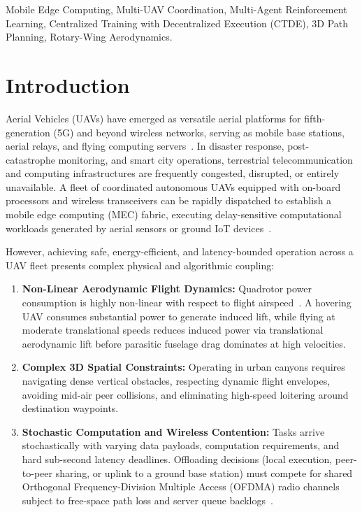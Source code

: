 \documentclass[conference]{IEEEtran}
\begin{document}
\begin{IEEEkeywords}
Mobile Edge Computing, Multi-UAV Coordination, Multi-Agent Reinforcement Learning, Centralized Training with Decentralized Execution (CTDE), 3D Path Planning, Rotary-Wing Aerodynamics.
\end{IEEEkeywords}

\section{Introduction}
 Aerial Vehicles (UAVs) have emerged as versatile aerial platforms for fifth-generation (5G) and beyond wireless networks, serving as mobile base stations, aerial relays, and flying computing servers~\cite{zeng2019tutorial, mao2017survey}. In disaster response, post-catastrophe monitoring, and smart city operations, terrestrial telecommunication and computing infrastructures are frequently congested, disrupted, or entirely unavailable. A fleet of coordinated autonomous UAVs equipped with on-board processors and wireless transceivers can be rapidly dispatched to establish a mobile edge computing (MEC) fabric, executing delay-sensitive computational workloads generated by aerial sensors or ground IoT devices~\cite{wang2020trajectory, yang2021uav}.

However, achieving safe, energy-efficient, and latency-bounded operation across a UAV fleet presents complex physical and algorithmic coupling:
\begin{enumerate}
    \item \textbf{Non-Linear Aerodynamic Flight Dynamics:} Quadrotor power consumption is highly non-linear with respect to flight airspeed~\cite{zeng2019energy}. A hovering UAV consumes substantial power to generate induced lift, while flying at moderate translational speeds reduces induced power via translational aerodynamic lift before parasitic fuselage drag dominates at high velocities.
    \item \textbf{Complex 3D Spatial Constraints:} Operating in urban canyons requires navigating dense vertical obstacles, respecting dynamic flight envelopes, avoiding mid-air peer collisions, and eliminating high-speed loitering around destination waypoints.
    \item \textbf{Stochastic Computation and Wireless Contention:} Tasks arrive stochastically with varying data payloads, computation requirements, and hard sub-second latency deadlines. Offloading decisions (local execution, peer-to-peer sharing, or uplink to a ground base station) must compete for shared Orthogonal Frequency-Division Multiple Access (OFDMA) radio channels subject to free-space path loss and server queue backlogs~\cite{dai2022joint}.
\end{enumerate}
\end{document}
